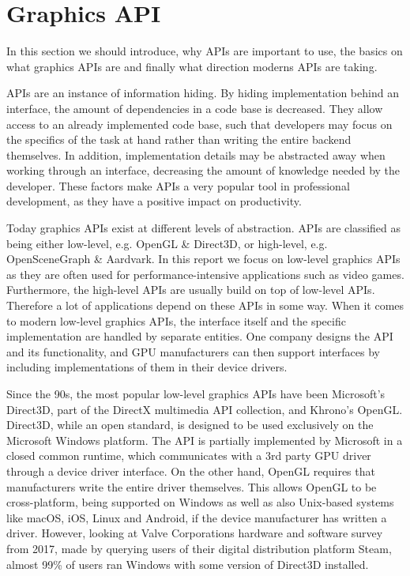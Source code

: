 \section{Graphics \acrshort{API}}\label{sec:graphics_apis}
\begin{sectionmeta}
In this section we should introduce, why APIs are important to use, the basics on what graphics APIs are and finally what direction moderns APIs are taking.
\end{sectionmeta}
\glspl{API} are an instance of information hiding.
By hiding implementation behind an interface, the amount of dependencies in a code base is decreased.  
They allow access to an already implemented code base, such that developers may focus on the specifics of the task at hand rather than writing the entire backend themselves.
In addition, implementation details may be abstracted away when working through an interface,  decreasing the amount of knowledge needed by the developer.
These factors make \glspl{API} a very popular tool in professional development, as they have a positive impact on productivity. 

Today graphics \glspl{API} exist at different levels of abstraction. 
\glspl{API} are classified as being either low-level, e.g. OpenGL \& Direct3D, or high-level, e.g. OpenSceneGraph \& Aardvark.
In this report we focus on low-level graphics \glspl{API} as they are often used for performance-intensive applications such as video games.
Furthermore, the high-level \glspl{API} are usually build on top of low-level \glspl{API}.  
Therefore a lot of applications depend on these \glspl{API} in some way.
When it comes to modern low-level graphics \glspl{API}, the interface itself and the specific implementation are handled by separate entities. 
One company designs the \gls{API} and its functionality, and \gls{GPU} manufacturers can then support interfaces by including implementations of them in their device drivers.

Since the 90s, the most popular low-level graphics \glspl{API} have been Microsoft’s Direct3D, part of the DirectX multimedia \gls{API} collection, and Khrono’s OpenGL. 
Direct3D, while an open standard, is designed to be used exclusively on the Microsoft Windows platform.
The \gls{API} is partially implemented by Microsoft in a closed common runtime, which communicates with a 3rd party \gls{GPU} driver through a device driver interface.
On the other hand, OpenGL requires that manufacturers write the entire driver themselves.
This allows OpenGL to be cross-platform, being supported on Windows as well as also Unix-based systems like macOS, iOS, Linux and Android, if the device manufacturer has written a driver.
However, looking at Valve Corporations hardware and software survey from 2017\cite{steamsurvey}, made by querying users of their digital distribution platform Steam,  almost 99\% of users ran Windows with some version of Direct3D installed. 

